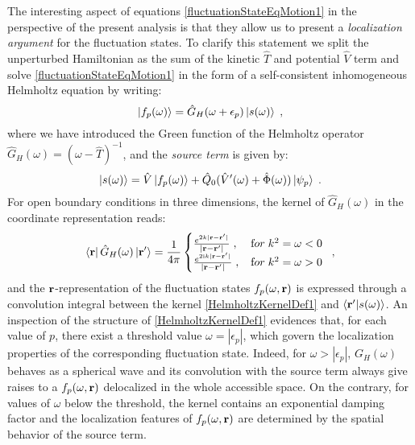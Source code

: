 \documentclass[reprint,aps,prb]{revtex4-1}
\renewcommand{\r}{{\bf r}}
\newcommand{\eps}{\epsilon}
\newcommand{\ii}{\mathrm{i}}
\newcommand{\be}{\begin{equation}}
\newcommand{\ee}{\end{equation}}
\newcommand{\nn}{\notag}
\newcommand{\lb}{\label}
\newcommand{\op}[1]{\hat {#1}}
\newcommand{\brket}[2]{\langle  #1 | #2 \rangle} %
\begin{document}
The interesting aspect of equations \eqref{fluctuationStateEqMotion1} in the perspective of the present analysis is that they allow us to present a 
\emph{localization argument} for the fluctuation states. To clarify this statement we split the unperturbed Hamiltonian as the sum of the kinetic $\op T$ and potential 
$\op V$ term and solve \eqref{fluctuationStateEqMotion1} in the form of a self-consistent inhomogeneous Helmholtz equation by writing:
\be
\ket{f_p(\omega)} = \op G_H(\omega+\epsilon_p)\ket{s(\omega)} \;,
\ee
where we have introduced the Green function of the Helmholtz operator $\op G_H(\omega) = (\omega-\op T)^{-1}$, %
and the \emph{source term} is given by:
\be
\ket{s(\omega)} =  \op V\ket{f_p(\omega)} + \op Q_0(\op V'(\omega) + \op \Phi(\omega))\ket{\psi_p} \;.\nn
\ee
For open boundary conditions in three dimensions, the kernel of $\op G_H(\omega)$ in the coordinate representation reads: 
\be\lb{HelmholtzKernelDef1}
\bra{\r} \op G_H(\omega) \ket{\r'} = \frac{1}{4\pi} \begin{cases}
\frac{e^{2k|\r - \r' |}}{|\r- \r' |} \;,\; & {\textrm for}\; k^2 = \omega  < 0\; \\ 
\frac{e^{2\ii k |\r-\r' |}}{|\r-\r' |} \;, & {\textrm for} \; k^2 = \omega > 0
\end{cases} \;,
\ee
and the $\r$-representation of the fluctuation states $f_p(\omega,\r)$ is expressed through a convolution integral between the kernel \eqref{HelmholtzKernelDef1} and
$\brket{\r'}{s(\omega)}$.
An inspection of the structure of \eqref{HelmholtzKernelDef1} evidences that, for each value of $p$, there exist a threshold value $\omega = |\eps_p|$, 
which govern the localization properties of the corresponding fluctuation state. Indeed, for $\omega > |\eps_p|$,  $G_H(\omega)$ behaves as a spherical wave and its
convolution with the source term always give raises to a $f_p(\omega,\r)$ delocalized in the whole accessible space. On the contrary, for values of $\omega$ below the threshold,
the kernel contains an exponential damping factor and the localization features of $f_p(\omega,\r)$ are determined by the spatial behavior of the source term.  
\end{document}
